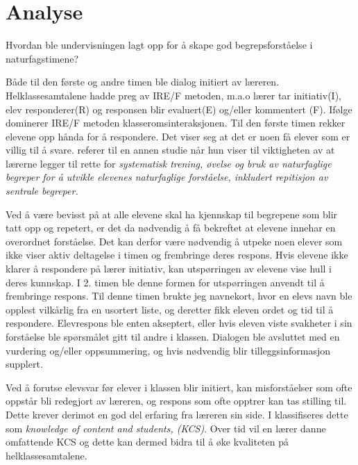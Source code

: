 \documentclass[main.tex]{subfiles}
\begin{document}
\section*{Analyse}
\label{sec:2}
Hvordan ble undervisningen lagt opp for å skape god begrepsforståelse i naturfagstimene?


Både til den første og andre timen ble dialog initiert av læreren. Helklassesamtalene hadde preg av
IRE/F metoden, m.a.o lærer tar initiativ(I), elev responderer(R) og responsen blir evaluert(E) 
og/eller kommentert (F). Ifølge  
dominerer IRE/F metoden klasseromsinteraksjonen. Til den første timen rekker elevene opp hånda for å 
respondere. Det viser seg at det er noen få elever som er villig til å svare. 
 referer til en annen studie når hun viser til viktigheten av at lærerne 
legger til rette for \emph{systematisk trening, øvelse og bruk av naturfaglige begreper for å utvikle 
elevenes naturfaglige forståelse, inkludert repitisjon av sentrale begreper.}

Ved å være bevisst på at alle elevene skal ha kjennskap til 
begrepene som blir tatt opp og repetert, er det da nødvendig å få bekreftet at elevene innehar en 
overordnet forståelse. Det kan derfor være nødvendig å utpeke noen elever som ikke viser aktiv 
deltagelse i timen og frembringe deres respons. Hvis elevene ikke klarer å respondere på lærer 
initiativ, kan utspørringen av elevene vise hull i deres kunnskap. I 2. timen ble denne formen for
utspørringen anvendt til å frembringe respons. Til denne timen brukte jeg navnekort, hvor en elevs navn 
ble opplest vilkårlig fra en usortert liste, og deretter fikk eleven ordet og tid til å respondere. 
Elevrespons ble enten akseptert, eller hvis eleven viste svakheter i sin forståelse ble spørsmålet 
gitt til andre i klassen. Dialogen ble avsluttet med en vurdering og/eller oppsummering, og hvis 
nødvendig blir tilleggsinformasjon supplert. 

Ved å forutse elevsvar før elever i klassen blir initiert, kan misforståelser som ofte oppstår bli redegjort
av læreren, og respons som ofte opptrer kan tas stilling til. Dette krever derimot en god del erfaring fra 
læreren sin side. I  klassifiseres dette som \emph{knowledge of content and students, (KCS)}.
Over tid vil en lærer danne omfattende KCS og dette kan dermed bidra til å øke kvaliteten på helklassesamtalene.
\end{document}
